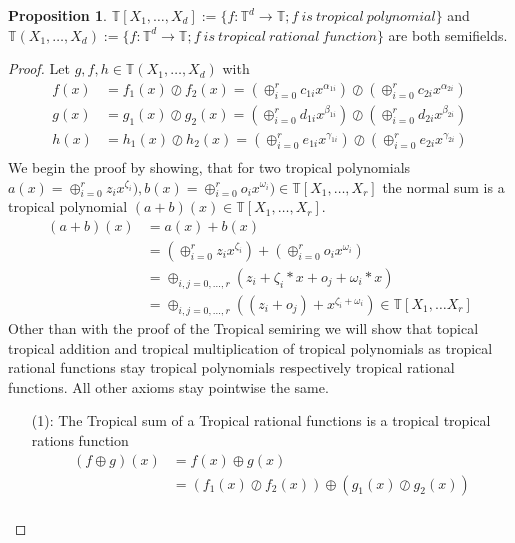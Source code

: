 \documentclass{article}
\theoremstyle{definition}
\newtheorem{proposition}[theorem]{Proposition}
\begin{document}
\begin{proposition}
$\mathbb{T}[X_1, \dots , X_d] := \{ f: \mathbb{T}^{d} \to \mathbb{T} ; f \ is \ tropical \ polynomial \}$ and \ $ \mathbb{T}(X_1, \dots , X_d) := \{ f: \mathbb{T}^{d} \to \mathbb{T} ; f \ is \ tropical \ rational \ function \}$ are both semifields. \cite[p.~3]{zhang2018tropical}
\end{proposition}
\begin{proof}
Let $g,f,h \in \mathbb{T}(X_1, \dots ,X_d)$ with 
\begin{align*}
f(x) &= f_1(x) \oslash f_2(x) = (\oplus_{i=0}^r c_{1i} x^{\alpha_{1i}}) \oslash (\oplus_{i=0}^r c_{2i} x^{\alpha_{2i}}) \\
g(x) &= g_1(x) \oslash g_2(x) = (\oplus_{i=0}^r d_{1i} x^{\beta_{1i}}) \oslash (\oplus_{i=0}^r d_{2i} x^{\beta_{2i}}) \\
h(x) &= h_1(x) \oslash h_2(x) = (\oplus_{i=0}^r e_{1i} x^{\gamma_{1i}}) \oslash (\oplus_{i=0}^r e_{2i} x^{\gamma_{2i}}) \\
\end{align*}
We begin the proof by showing, that for two tropical polynomials $a(x)= \oplus_{i=0}^r z_{i} x^{\zeta_{i}}), b(x)= \oplus_{i=0}^r o_{i} x^{\omega_{i}}) \in \mathbb{T}[X_1, \dots , X_r]$ the normal sum is a tropical polynomial $(a + b)(x) \in \mathbb{T}[X_1, \dots , X_r]$.
\begin{align*} 
(a + b)(x) &= a(x) + b(x) \\
&=  (\oplus_{i=0}^r z_{i} x^{\zeta_{i}}) + (\oplus_{i=0}^r o_{i} x^{\omega_{i}}) \\
&= \oplus_{i, j = 0, \dots , r} (z_{i} + \zeta_{i} * x + o_{j} + \omega_{i} * x) \\
&= \oplus_{i, j = 0, \dots , r} ((z_{i} + o_{j}) + x^{\zeta_{i} + \omega_{i}}) \in \mathbb{T}[X_1, \dots X_r]
\end{align*}
Other than with the proof of the Tropical semiring we will show that topical tropical addition and tropical multiplication of tropical polynomials as tropical rational functions stay tropical polynomials respectively tropical rational functions. All other axioms stay pointwise the same.
\begin{itemize}
\item[(1):]
The Tropical sum of a Tropical rational functions is a tropical tropical rations function
\begin{align*}
(f \oplus g)(x) &= f(x) \oplus g(x) \\
&=(f_1(x) \oslash f_2(x)) \oplus (g_1(x) \oslash g_2(x)) \\

\end{align*}
\end{itemize}
\end{proof}
\end{document}
